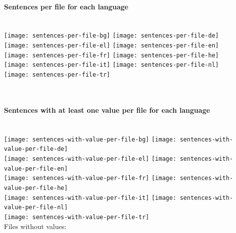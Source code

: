 \documentclass[a4paper]{article}
\newenvironment{figures}[1]{\noindent\begin{minipage}{\linewidth}\paragraph{#1}\noindent\\[\baselineskip]}{\end{minipage}\\[4ex]}
\begin{document}
\begin{figures}{Sentences per file for each language}
\texttt{[image: sentences-per-file-bg]}%
\hfill%
\texttt{[image: sentences-per-file-de]}\\[4ex]
\texttt{[image: sentences-per-file-el]}%
\hfill%
\texttt{[image: sentences-per-file-en]}\\[4ex]
\texttt{[image: sentences-per-file-fr]}%
\hfill%
\texttt{[image: sentences-per-file-he]}\\[4ex]
\texttt{[image: sentences-per-file-it]}%
\hfill%
\texttt{[image: sentences-per-file-nl]}\\[4ex]
\texttt{[image: sentences-per-file-tr]}
\end{figures}



\begin{figures}{Sentences with at least one value per file for each language}
\texttt{[image: sentences-with-value-per-file-bg]}%
\hfill%
\texttt{[image: sentences-with-value-per-file-de]}\\[4ex]
\texttt{[image: sentences-with-value-per-file-el]}%
\hfill%
\texttt{[image: sentences-with-value-per-file-en]}\\[4ex]
\texttt{[image: sentences-with-value-per-file-fr]}%
\hfill%
\texttt{[image: sentences-with-value-per-file-he]}\\[4ex]
\texttt{[image: sentences-with-value-per-file-it]}%
\hfill%
\texttt{[image: sentences-with-value-per-file-nl]}\\[4ex]
\texttt{[image: sentences-with-value-per-file-tr]}\\

\noindent
Files without values: 
\end{figures}
\end{document}
